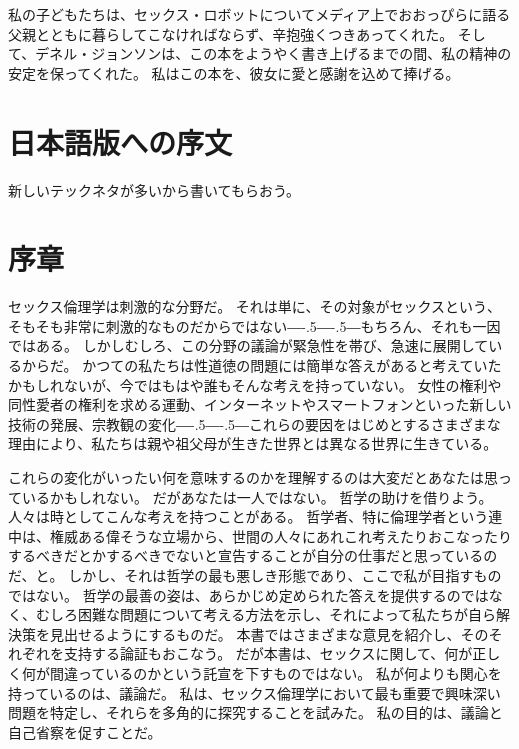 \documentclass[paper=a4,book,openany]{jlreq}
\def\DDASH{―\kern-.5\zw―\kern-.5\zw―} %
\begin{document}
私の子どもたちは、セックス・ロボットについてメディア上でおおっぴらに語る父親とともに暮らしてこなければならず、辛抱強くつきあってくれた。
そして、デネル・ジョンソンは、この本をようやく書き上げるまでの間、私の精神の安定を保ってくれた。
私はこの本を、彼女に愛と感謝を込めて捧げる。

\chapter*{日本語版への序文}

新しいテックネタが多いから書いてもらおう。
\fi
\mainmatter

\chapter*{序章}
{}

セックス倫理学は刺激的な分野だ。
それは単に、その対象がセックスという、そもそも非常に刺激的なものだからではない{\DDASH}もちろん、それも一因ではある。
しかしむしろ、この分野の議論が緊急性を帯び、急速に展開しているからだ。
かつての私たちは性道徳の問題には簡単な答えがあると考えていたかもしれないが、今ではもはや誰もそんな考えを持っていない。
女性の権利や同性愛者の権利を求める運動、インターネットやスマートフォンといった新しい技術の発展、宗教観の変化{\DDASH}これらの要因をはじめとするさまざまな理由により、私たちは親や祖父母が生きた世界とは異なる世界に生きている。

これらの変化がいったい何を意味するのかを理解するのは大変だとあなたは思っているかもしれない。
だがあなたは一人ではない。
哲学の助けを借りよう。
人々は時としてこんな考えを持つことがある。
哲学者、特に倫理学者という連中は、権威ある偉そうな立場から、世間の人々にあれこれ考えたりおこなったりするべきだとかするべきでないと宣告することが自分の仕事だと思っているのだ、と。
しかし、それは哲学の最も悪しき形態であり、ここで私が目指すものではない。
哲学の最善の姿は、あらかじめ定められた答えを提供するのではなく、むしろ困難な問題について考える方法を示し、それによって私たちが自ら解決策を見出せるようにするものだ。
本書ではさまざまな意見を紹介し、そのそれぞれを支持する論証もおこなう。
だが本書は、セックスに関して、何が正しく何が間違っているのかという託宣を下すものではない。
私が何よりも関心を持っているのは、議論だ。
私は、セックス倫理学において最も重要で興味深い問題を特定し、それらを多角的に探究することを試みた。
私の目的は、議論と自己省察を促すことだ。
\end{document}
